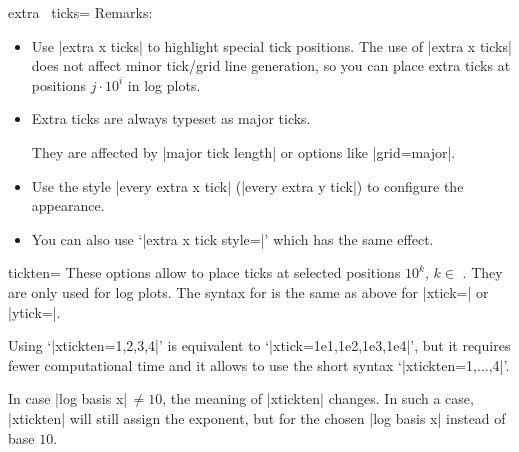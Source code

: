 \begin{pgfplotsxykey}{extra \x\ ticks=}
    Remarks:
    \begin{itemize}
        \item Use |extra x ticks| to highlight special tick positions. The
            use of |extra x ticks| does not affect minor tick/grid line
            generation, so you can place extra ticks at positions $j\cdot
            10^i$ in log plots.
        \item Extra ticks are always typeset as major ticks.

            They are affected by |major tick length| or options like
            |grid=major|.
        \item Use the style |every extra x tick| (|every extra y tick|) to
            configure the appearance.
        \item You can also use `|extra x tick style=|' which has
            the same effect.
    \end{itemize}
\end{pgfplotsxykey}

\begin{pgfplotsxykey}{\x tickten=}
    These options allow to place ticks at selected positions $10^k$, $k \in$
    . They are only used for log plots. The
    syntax for  is the same as above for
    |xtick=| or |ytick=|.

    Using `|xtickten={1,2,3,4}|' is equivalent to `|xtick={1e1,1e2,1e3,1e4}|',
    but it requires fewer computational time and it allows to use the short
    syntax `|xtickten={1,...,4}|'.
\begin{codeexample}[]
\end{codeexample}

    In case |log basis x|$\,\neq 10$, the meaning of |xtickten| changes. In
    such a case, |xtickten| will still assign the exponent, but for the chosen
    |log basis x| instead of base $10$.
\end{pgfplotsxykey}

